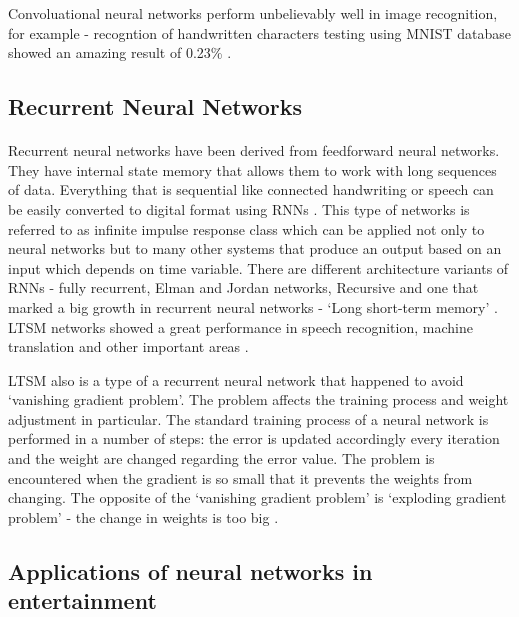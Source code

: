 \documentclass[12pt]{report}
\begin{document}
    Convoluational neural networks perform unbelievably well in image recognition, for example - recogntion of handwritten characters testing using MNIST database showed an amazing result of 0.23\% \citep{image_classification_article}.

    \subsection*{Recurrent Neural Networks}
    \paragraph{}

    Recurrent neural networks have been derived from feedforward neural networks. They have internal state memory that allows them to work with long sequences of data. Everything that is sequential like connected handwriting or speech can be easily converted to digital format using RNNs \citep{rnn_article}.
    This type of networks is referred to as infinite impulse response class which can be applied not only to neural networks but to many other systems that produce an output based on an input which depends on time variable. 
    There are different architecture variants of RNNs - fully recurrent, Elman and Jordan networks, Recursive and one that marked a big growth in recurrent neural networks - `Long short-term memory' \citep{10.1162/neco.1997.9.8.1735}.
    LTSM networks showed a great performance in speech recognition, machine translation and other important areas \citep{ltsm_article}.

    LTSM also is a type of a recurrent neural network that happened to avoid `vanishing gradient problem'. The problem affects the training process and weight adjustment in particular. The standard training process of a neural network is performed in a number of steps:
    the error is updated accordingly every iteration and the weight are changed regarding the error value. The problem is encountered when the gradient is so small that it prevents the weights from changing. The opposite of the `vanishing gradient problem' is `exploding gradient problem' - the change in weights is too big \citep{vanishing_weight}.

    \subsection*{Applications of neural networks in entertainment}
\end{document}
